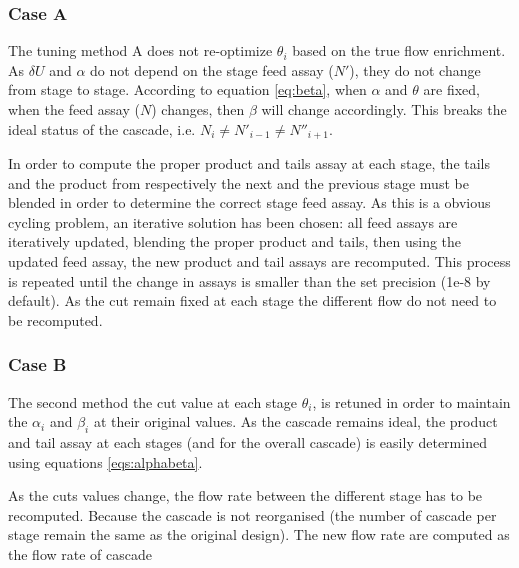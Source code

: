 \subsubsection{Case A}
The tuning method A does not re-optimize $\theta_i$ based on the true flow
enrichment. As $\delta U$ and $\alpha$ do not depend on the stage feed assay
($N'$), they do not change from stage to stage. According to equation
\eqref{eq:beta}, when $\alpha$ and $\theta$ are fixed, when the feed assay ($N$)
changes, then $\beta$ will change accordingly.  This breaks the ideal status of
the cascade, i.e.  $N_{i} \neq N'_{i-1} \neq N''_{i+1}$.

In order to compute the proper product and tails assay at each stage, the
tails and the product from respectively the next and the previous stage must be
blended in order to determine the correct stage feed assay. As this is a obvious
cycling problem, an iterative solution has been chosen: all feed assays are
iteratively updated, blending the proper product and tails, then using the
updated feed assay, the new product and tail assays are recomputed. This process
is repeated until the change in assays is smaller than the set precision (1e-8
by default).
As the cut remain fixed at each stage the different flow do not need to be
recomputed.


\subsubsection{Case B}

The second method the cut value at each stage $\theta_i$, is retuned in order to
maintain the $\alpha_i$ and $\beta_i$ at their original values. As the cascade
remains ideal, the product and tail assay at each stages (and for the overall
cascade) is easily determined using equations \eqref{eqs:alphabeta}.

As the cuts values change, the flow rate between the different stage has to be
recomputed. Because the cascade is not reorganised (the number of cascade per
stage remain the same as the original design). The new flow rate are computed as the flow rate of cascade   



